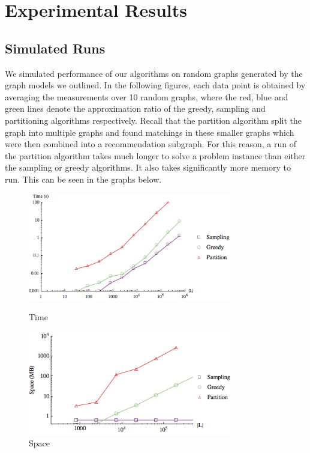 \section{Experimental Results}

\subsection{Simulated Runs}
We simulated performance of our algorithms on random graphs generated
by the graph models we outlined. In the following figures, each data
point is obtained by averaging the measurements over 10 random
graphs,  where the red, blue and green lines denote the approximation
ratio of the greedy, sampling and partitioning algorithms respectively.
Recall that the partition algorithm split the graph into multiple graphs and found
matchings in these smaller graphs which were then combined into a
recommendation subgraph. For this reason, a run of the partition
algorithm takes much longer to solve a problem instance than either the
sampling or greedy algorithms. It also takes significantly more memory to
run. This can be seen in the graphs below.


\begin{figure}[t]
\centering
\begin{minipage}[h]{0.48\textwidth}
\centering
\includegraphics[width=0.8\textwidth]{images/time.png}
\caption{Time}\label{fig:a=1:1}
\end{minipage}
\hspace{0cm}
\begin{minipage}[h]{0.48\textwidth}
\centering
\includegraphics[width=0.8\textwidth]{images/space.png}
\caption{Space}\label{fig:a=1:2}
\end{minipage}
\vspace{-0.2in}
\end{figure}

